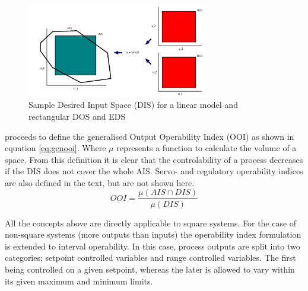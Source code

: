 \begin{figure}[htbp]
  \centering
  \includegraphics[width=8cm]{graph/sample_dis}
  \caption[Sample Desired Input Space]{Sample Desired Input Space (DIS) for
    a linear model and rectangular DOS and EDS}
  \label{fig:sampledis}
\end{figure}

\citet{vinsonphd} proceeds to define the generalised Output Operability Index (OOI) as shown in equation \ref{eq:genooi}. 
Where $\mu$ represents a function to calculate the volume of a space.
From this definition it is clear that the controlability of a process decreases if the DIS does not cover the whole AIS. 
Servo- and regulatory operability indices are also defined in the text, but are not shown here.
\begin{equation}
  \label{eq:genooi}
     OOI = \frac{\mu(AIS\cap DIS)}{\mu(DIS)}
\end{equation}

All the concepts above are directly applicable to square systems.
For the case of non-square systems (more outputs than inputs) the operability index formulation is extended to interval operability. 
In this case, process outputs are split into two categories; setpoint controlled variables and range controlled variables.
The first being controlled on a given setpoint, whereas the later is allowed to vary within its given maximum and minimum limits.

